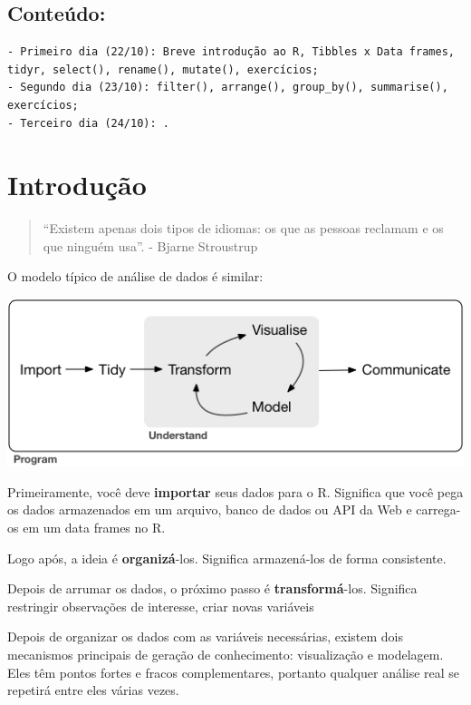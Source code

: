 \documentclass[]{book}
\begin{document}
\hypertarget{conteuxfado}{%
\section{Conteúdo:}\label{conteuxfado}}

\begin{verbatim}
- Primeiro dia (22/10): Breve introdução ao R, Tibbles x Data frames,
tidyr, select(), rename(), mutate(), exercícios; 
- Segundo dia (23/10): filter(), arrange(), group_by(), summarise(),
exercícios;
- Terceiro dia (24/10): .
\end{verbatim}

\hypertarget{intro}{%
\chapter{Introdução}\label{intro}}

\begin{quote}
``Existem apenas dois tipos de idiomas: os que as pessoas reclamam e os que ninguém usa''. - Bjarne Stroustrup
\end{quote}

O modelo típico de análise de dados é similar:

\begin{center}\includegraphics[width=0.75\linewidth]{imagens/data-science} \end{center}

Primeiramente, você deve \textbf{importar} seus dados para o R. Significa que você pega os dados armazenados em um arquivo, banco de dados ou API da Web e carrega-os em um data frames no R.

Logo após, a ideia é \textbf{organizá}-los. Significa armazená-los de forma consistente.

Depois de arrumar os dados, o próximo passo é \textbf{transformá}-los. Significa restringir observações de interesse, criar novas variáveis

Depois de organizar os dados com as variáveis necessárias, existem dois mecanismos principais de geração de conhecimento: visualização e modelagem. Eles têm pontos fortes e fracos complementares, portanto qualquer análise real se repetirá entre eles várias vezes.
\end{document}
